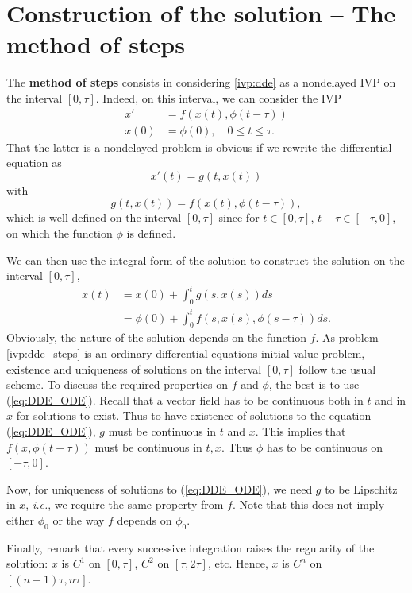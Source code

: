 \section{Construction of the solution -- The method of steps}
\label{sec:construct_sol_dde}
The \textbf{method of steps} consists in considering \eqref{ivp:dde} as a
nondelayed IVP on the interval $[0,\tau]$. Indeed, on this
interval, we can consider the IVP
\begin{equation}\label{ivp:dde_steps}
\begin{aligned}
x' &= f(x(t),\phi(t-\tau)) \\
x(0) &= \phi(0),\quad 0\leq t\leq \tau.
\end{aligned}
\end{equation}
That the latter is a nondelayed problem is obvious if we rewrite the differential equation
as 
\begin{equation}\label{eq:DDE_ODE}
x'(t)=g(t,x(t))
\end{equation}
with
\[
g(t,x(t))=f(x(t),\phi(t-\tau)),
\]
which is well defined on the interval $[0,\tau]$ since for $t\in[0,\tau]$,
$t-\tau\in[-\tau,0]$, on which the function $\phi$ is defined.

We can then use the integral form of the solution to construct the solution on the
interval $[0,\tau]$,
\begin{align*}
x(t)&=x(0)+\int_{0}^t g(s,x(s))ds \\
&=\phi(0)+\int_{0}^t f(s,x(s),\phi(s-\tau))ds.
\end{align*}
Obviously, the nature of the solution depends on the function
$f$. As problem \eqref{ivp:dde_steps} is an ordinary differential
equations initial value problem, existence and uniqueness of solutions
on the interval $[0,\tau]$ follow the usual scheme. To discuss
the required properties on $f$ and $\phi$, the best is to use
(\ref{eq:DDE_ODE}).
Recall that a vector field has to be continuous both in $t$ and in $x$
for solutions to exist. Thus to have existence of solutions to the
equation (\ref{eq:DDE_ODE}), $g$ must be continuous in $t$ and $x$. This
implies that $f(x,\phi(t-\tau))$ must be continuous in
$t,x$. Thus $\phi$ has to be continuous on $[-\tau,0]$.

Now, for uniqueness of solutions to (\ref{eq:DDE_ODE}), we need $g$ to
be Lipschitz in $x$, \emph{i.e.}, we require the same property from
$f$. Note that this does not imply either $\phi_0$ or the way $f$
depends on $\phi_0$.

Finally, remark that every successive integration raises the regularity of the
solution: $x$ is $C^1$ on $[0,\tau]$, $C^2$ on
$[\tau,2\tau]$, etc. Hence, $x$ is $C^n$ on
$[(n-1)\tau,n\tau]$. 





